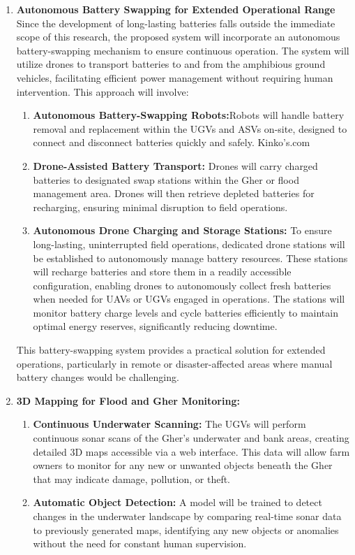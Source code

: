 \documentclass[conference]{IEEEtran}
\begin{document}
\begin{enumerate}
\begin{enumerate}
			\item \textbf{Autonomous Battery Swapping for Extended Operational Range}
				Since the development of long-lasting batteries falls outside the immediate scope of this research, the proposed system will incorporate an autonomous battery-swapping mechanism to ensure continuous operation. The system will utilize drones to transport batteries to and from the amphibious ground vehicles, facilitating efficient power management without requiring human intervention. This approach will involve:
				\begin{enumerate}
					\item \textbf{Autonomous Battery-Swapping Robots:}Robots will handle battery removal and replacement within the UGVs and ASVs on-site, designed to connect and disconnect batteries quickly and safely.
					Kinko's.com \item \textbf{Drone-Assisted Battery Transport: }Drones will carry charged batteries to designated swap stations within the Gher or flood management area. Drones will then retrieve depleted batteries for recharging, ensuring minimal disruption to field operations.			
					\item \textbf{Autonomous Drone Charging and Storage Stations: }To ensure long-lasting, uninterrupted field operations, dedicated drone stations will be established to autonomously manage battery resources. These stations will recharge batteries and store them in a readily accessible configuration, enabling drones to autonomously collect fresh batteries when needed for UAVs or UGVs engaged in operations. The stations will monitor battery charge levels and cycle batteries efficiently to maintain optimal energy reserves, significantly reducing downtime.
				\end{enumerate}
				This battery-swapping system provides a practical solution for extended operations, particularly in remote or disaster-affected areas where manual battery changes would be challenging.
		
		\item \textbf{3D Mapping for Flood and Gher Monitoring: }
				\begin{enumerate}
					\item \textbf{Continuous Underwater Scanning: }The UGVs will perform continuous sonar scans of the Gher’s underwater and bank areas, creating detailed 3D maps accessible via a web interface. This data will allow farm owners to monitor for any new or unwanted objects beneath the Gher that may indicate damage, pollution, or theft.
					\item \textbf{Automatic Object Detection: }A model will be trained to detect changes in the underwater landscape by comparing real-time sonar data to previously generated maps, identifying any new objects or anomalies without the need for constant human supervision.
				\end{enumerate}		
		\end{enumerate}
		

\end{enumerate}
\end{document}
